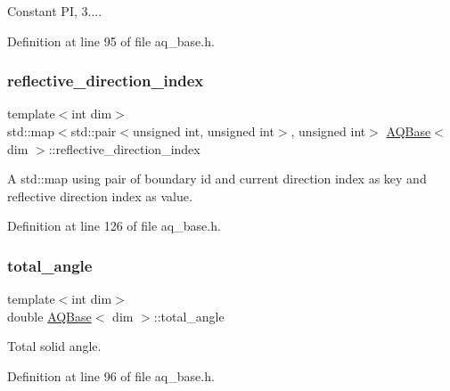 Constant PI, 3.... 



Definition at line 95 of file aq\+\_\+base.\+h.

\mbox{\label{class_a_q_base_a9aa6c274dd0ef167528bbec76637cc22}} 
\subsubsection{\texorpdfstring{reflective\+\_\+direction\+\_\+index}{reflective\_direction\_index}}
{\footnotesize\ttfamily template$<$int dim$>$ \\
std\+::map$<$std\+::pair$<$unsigned int, unsigned int$>$, unsigned int$>$ \hyperlink{class_a_q_base}{A\+Q\+Base}$<$ dim $>$\+::reflective\+\_\+direction\+\_\+index\hspace{0.3cm}{\ttfamily [protected]}}

A std\+::map using pair of boundary id and current direction index as key and reflective direction index as value. 

Definition at line 126 of file aq\+\_\+base.\+h.

\mbox{\label{class_a_q_base_a930e1dbffe2c99f42b76ea3164905ac1}} 
\subsubsection{\texorpdfstring{total\+\_\+angle}{total\_angle}}
{\footnotesize\ttfamily template$<$int dim$>$ \\
double \hyperlink{class_a_q_base}{A\+Q\+Base}$<$ dim $>$\+::total\+\_\+angle\hspace{0.3cm}{\ttfamily [protected]}}



Total solid angle. 



Definition at line 96 of file aq\+\_\+base.\+h.

\mbox{\label{class_a_q_base_a14d94b7179306f35228b90fd5f42c65a}} 
